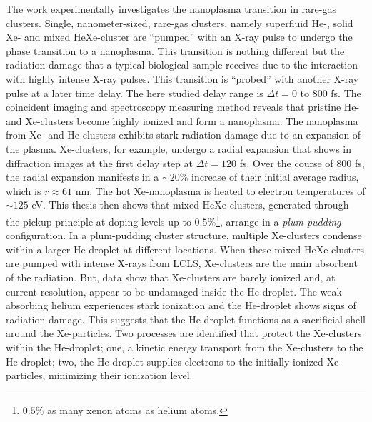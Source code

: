 The work experimentally investigates the nanoplasma transition in rare-gas clusters. Single, nanometer-sized, rare-gas clusters, namely superfluid He-, solid Xe- and mixed HeXe-cluster are ``pumped'' with an X-ray pulse to undergo the phase transition to a nanoplasma. This transition is nothing different but the radiation damage that a typical biological sample receives due to the interaction with highly intense X-ray pulses. This transition is ``probed'' with another X-ray pulse at a later time delay. The here studied delay range is $\Delta t=0$ to $800$ fs. The coincident imaging and spectroscopy measuring method reveals that pristine He- and Xe-clusters become highly ionized and form a nanoplasma. The nanoplasma from Xe- and He-clusters exhibits stark radiation damage due to an expansion of the plasma. Xe-clusters, for example, undergo a radial expansion that shows in diffraction images at the first delay step at $\Delta t = 120$ fs. Over the course of 800 fs, the radial expansion manifests in a $\sim 20 \%$ increase of their initial average radius, which is $r\approx 61$ nm. The hot Xe-nanoplasma is heated to electron temperatures of $\sim 125$ eV. This thesis then shows that mixed HeXe-clusters, generated through the pickup-principle at doping levels up to $0.5\%$\footnote{$0.5\%$ as many xenon atoms as helium atoms.}, arrange in a \textit{plum-pudding} configuration. In a plum-pudding cluster structure, multiple Xe-clusters condense within a larger He-droplet at different locations. When these mixed HeXe-clusters are pumped with intense X-rays from LCLS, Xe-clusters are the main absorbent of the radiation. But, data show that Xe-clusters are barely ionized and, at current resolution, appear to be undamaged inside the He-droplet. The weak absorbing helium experiences stark ionization and the He-droplet shows signs of radiation damage. This suggests that the He-droplet functions as a sacrificial shell around the Xe-particles. Two processes are identified that protect the Xe-clusters within the He-droplet; one, a kinetic energy transport from the Xe-clusters to the He-droplet; two, the He-droplet supplies electrons to the initially ionized Xe-particles, minimizing their ionization level.\\[1\baselineskip]
%

